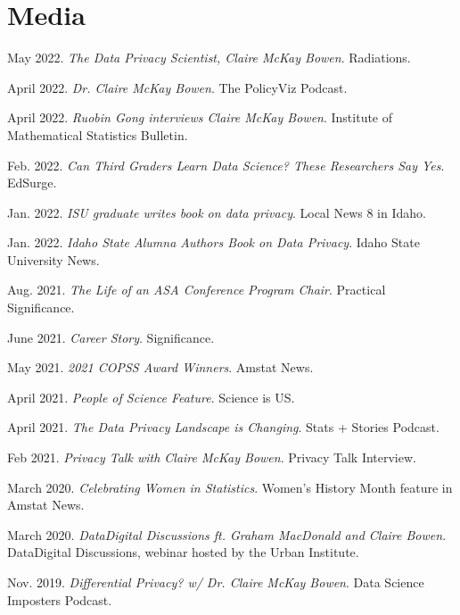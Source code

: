 \documentclass[11pt, letterpaper, roman]{moderncv} %
\begin{document}
\section{Media}
\begin{etaremune}[topsep=0pt, itemsep=2pt, partopsep=0pt, parsep=0pt]
    \item May 2022. \textit{The Data Privacy Scientist, Claire McKay Bowen}. Radiations.
    
    \item April 2022. \textit{Dr. Claire McKay Bowen}. The PolicyViz Podcast.
    
    \item April 2022. \textit{Ruobin Gong interviews Claire McKay Bowen}. Institute of Mathematical Statistics Bulletin.
    
    \item Feb. 2022. \textit{Can Third Graders Learn Data Science? These Researchers Say Yes}. EdSurge.
    
    \item Jan. 2022. \textit{ISU graduate writes book on data privacy}. Local News 8 in Idaho.
    
    \item Jan. 2022. \textit{Idaho State Alumna Authors Book on Data Privacy}. Idaho State University News.

    \item Aug. 2021. \textit{The Life of an ASA Conference Program Chair}. Practical Significance.    

    \item June 2021. \textit{Career Story}. Significance.
    
    \item May 2021. \textit{2021 COPSS Award Winners}. Amstat News.
    
    \item April 2021. \textit{People of Science Feature}. Science is US.
    
    \item April 2021. \textit{The Data Privacy Landscape is Changing}. Stats + Stories Podcast.
    
    \item Feb 2021. \textit{Privacy Talk with Claire McKay Bowen}. Privacy Talk Interview.

    \item March 2020. \textit{Celebrating Women in Statistics}. Women's History Month feature in Amstat News.

    \item March 2020. \textit{Data\@Urban Digital Discussions ft. Graham MacDonald and Claire Bowen}. Data\@Urban Digital Discussions, webinar hosted by the Urban Institute.
    
    \item Nov. 2019. \textit{Differential Privacy? w/ Dr. Claire McKay Bowen}. Data Science Imposters Podcast.
\end{etaremune}
\end{document}
